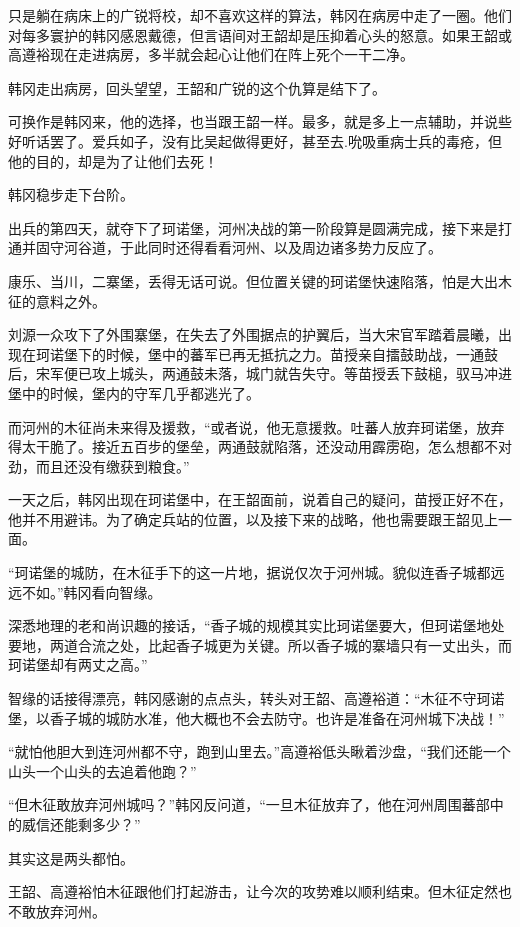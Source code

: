 只是躺在病床上的广锐将校，却不喜欢这样的算法，韩冈在病房中走了一圈。他们对每多寰护的韩冈感恩戴德，但言语间对王韶却是压抑着心头的怒意。如果王韶或高遵裕现在走进病房，多半就会起心让他们在阵上死个一干二净。

韩冈走出病房，回头望望，王韶和广锐的这个仇算是结下了。

可换作是韩冈来，他的选择，也当跟王韶一样。最多，就是多上一点辅助，并说些好听话罢了。爱兵如子，没有比吴起做得更好，甚至去.吮吸重病士兵的毒疮，但他的目的，却是为了让他们去死！

韩冈稳步走下台阶。

出兵的第四天，就夺下了珂诺堡，河州决战的第一阶段算是圆满完成，接下来是打通并固守河谷道，于此同时还得看看河州、以及周边诸多势力反应了。

康乐、当川，二寨堡，丢得无话可说。但位置关键的珂诺堡快速陷落，怕是大出木征的意料之外。

刘源一众攻下了外围寨堡，在失去了外围据点的护翼后，当大宋官军踏着晨曦，出现在珂诺堡下的时候，堡中的蕃军已再无抵抗之力。苗授亲自擂鼓助战，一通鼓后，宋军便已攻上城头，两通鼓未落，城门就告失守。等苗授丢下鼓槌，驭马冲进堡中的时候，堡内的守军几乎都逃光了。

而河州的木征尚未来得及援救，“或者说，他无意援救。吐蕃人放弃珂诺堡，放弃得太干脆了。接近五百步的堡垒，两通鼓就陷落，还没动用霹雳砲，怎么想都不对劲，而且还没有缴获到粮食。”

一天之后，韩冈出现在珂诺堡中，在王韶面前，说着自己的疑问，苗授正好不在，他并不用避讳。为了确定兵站的位置，以及接下来的战略，他也需要跟王韶见上一面。

“珂诺堡的城防，在木征手下的这一片地，据说仅次于河州城。貌似连香子城都远远不如。”韩冈看向智缘。

深悉地理的老和尚识趣的接话，“香子城的规模其实比珂诺堡要大，但珂诺堡地处要地，两道合流之处，比起香子城更为关键。所以香子城的寨墙只有一丈出头，而珂诺堡却有两丈之高。”

智缘的话接得漂亮，韩冈感谢的点点头，转头对王韶、高遵裕道：“木征不守珂诺堡，以香子城的城防水准，他大概也不会去防守。也许是准备在河州城下决战！”

“就怕他胆大到连河州都不守，跑到山里去。”高遵裕低头瞅着沙盘，“我们还能一个山头一个山头的去追着他跑？”

“但木征敢放弃河州城吗？”韩冈反问道，“一旦木征放弃了，他在河州周围蕃部中的威信还能剩多少？”

其实这是两头都怕。

王韶、高遵裕怕木征跟他们打起游击，让今次的攻势难以顺利结束。但木征定然也不敢放弃河州。

